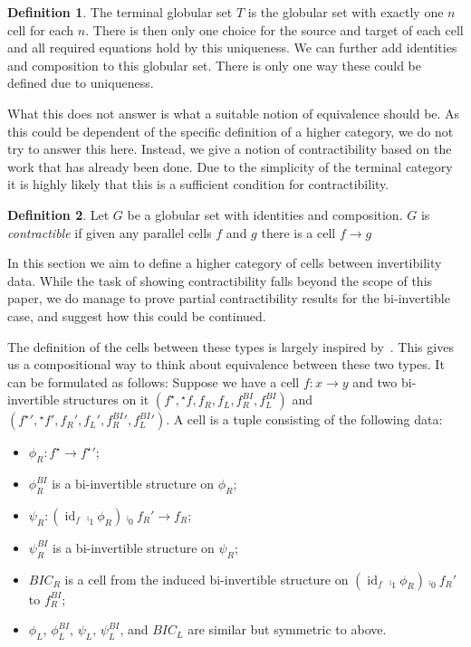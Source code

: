\documentclass[draft]{article}
\theoremstyle{definition} \newtheorem{definition}{Definition}
\theoremstyle{remark} \newtheorem{remark}{Remark}
\DeclareMathOperator{\id}{id}
\newcommand{\linv}[1]{{}^\star\!#1} \newcommand{\rinv}[1]{#1^\star}
\begin{document}
\begin{definition}
  The terminal globular set \(T\) is the globular set with exactly one
  \(n\) cell for each \(n\). There is then only one choice for the
  source and target of each cell and all required equations hold by
  this uniqueness. We can further add identities and composition to
  this globular set. There is only one way these could be defined due
  to uniqueness.
\end{definition}

What this does not answer is what a suitable notion of equivalence
should be. As this could be dependent of the specific definition of a
higher category, we do not try to answer this here. Instead, we give a
notion of contractibility based on the work that has already been
done. Due to the simplicity of the terminal category it is highly
likely that this is a sufficient condition for contractibility.

\begin{definition}
  Let \(G\) be a globular set with identities and composition. \(G\)
  is \emph{contractible} if given any parallel cells \(f\) and \(g\)
  there is a cell \(f \to g\)
\end{definition}

In this section we aim to define a higher category of cells between
invertibility data. While the task of showing contractibility falls
beyond the scope of this paper, we do manage to prove partial
contractibility results for the bi-invertible case, and suggest how
this could be continued.

The definition of the cells between these types is largely inspired
by~\cite[Lemma 4.2.5]{hottbook}. This gives us a compositional way to
think about equivalence between these two types. It can be formulated
as follows: Suppose we have a cell \(f : x \to y\) and two
bi-invertible structures on it \((\rinv f, \linv f, f_R, f_L,
f_R^{BI}, f_L^{BI})\) and \((\rinv f{}' , \linv f{}', f_R', f_L',
f_R^{BI}', f_L^{BI}')\). A cell is a tuple
consisting of the following data:
\begin{itemize}
\item \(\phi_R : \rinv f \to \rinv f{}'\);
\item \(\phi_R^{BI}\) is a bi-invertible structure on \(\phi_R\);
\item \(\psi_R : (\id_f \comp_1 \phi_R) \comp_0 f_R' \to f_R\);
\item \(\psi_R^{BI}\) is a bi-invertible structure on \(\psi_R\);
\item \(BIC_R\) is a cell from the induced bi-invertible structure on
  \((\id_f \comp_1 \phi_R) \comp_0 f_R'\) to \(f_R^{BI}\);
\item \(\phi_L\), \(\phi_L^{BI}\), \(\psi_L\), \(\psi_L^{BI}\), and
  \(BIC_L\) are similar but symmetric to above.
\end{itemize}
\end{document}
